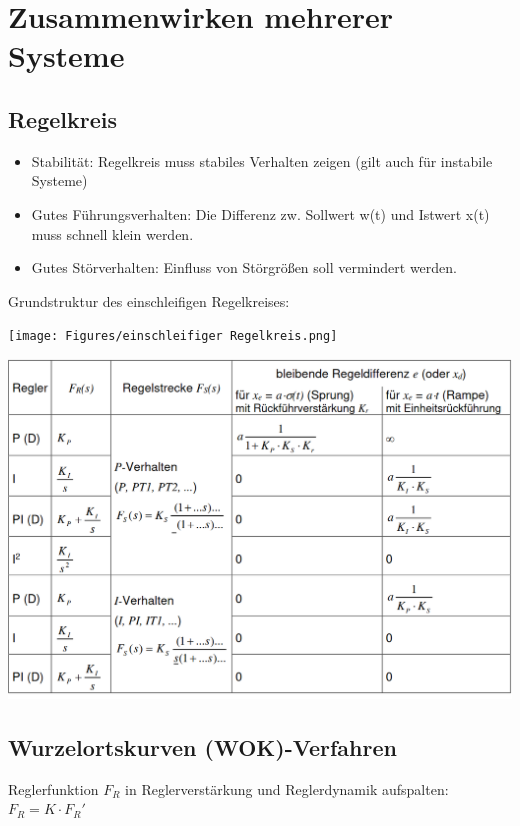 \section{Zusammenwirken mehrerer Systeme}
\subsection{Regelkreis}
\begin{mdframed}[style=exercise,frametitle=Anforderungen:]
	\begin{itemize}[leftmargin=*]
		\item Stabilität: Regelkreis muss stabiles Verhalten zeigen (gilt
		      auch für instabile Systeme)
		\item Gutes Führungsverhalten: Die Differenz zw. Sollwert w(t) und
		      Istwert x(t) muss schnell klein werden.
		\item Gutes Störverhalten: Einfluss von Störgrößen soll vermindert
		      werden.
	\end{itemize}
\end{mdframed}

Grundstruktur des einschleifigen Regelkreises:

\texttt{[image: Figures/einschleifiger Regelkreis.png]}

\includegraphics[width=0.98\columnwidth]{Figures/Reglerauswahl.png}


\subsection{Wurzelortskurven (WOK)-Verfahren}
\begin{mdframed}[style=exercise]
	Reglerfunktion $F_R$ in Reglerverstärkung und Reglerdynamik aufspalten:
	$F_R =K \cdot F_R ' $
\end{mdframed}

